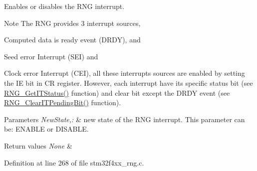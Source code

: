 Enables or disables the R\-N\-G interrupt. 

\begin{DoxyNote}{Note}
The R\-N\-G provides 3 interrupt sources,
\begin{DoxyItemize}
\item Computed data is ready event (D\-R\-D\-Y), and
\item Seed error Interrupt (S\-E\-I) and
\item Clock error Interrupt (C\-E\-I), all these interrupts sources are enabled by setting the I\-E bit in C\-R register. However, each interrupt have its specific status bit (see \hyperlink{group___r_n_g_gab58eaab67698770d9ea9775fb280271f}{R\-N\-G\-\_\-\-Get\-I\-T\-Status()} function) and clear bit except the D\-R\-D\-Y event (see \hyperlink{group___r_n_g_ga2b1c78c003cd5c886e09fdbc2c89cacb}{R\-N\-G\-\_\-\-Clear\-I\-T\-Pending\-Bit()} function). 
\end{DoxyItemize}
\end{DoxyNote}

\begin{DoxyParams}{Parameters}
{\em New\-State,\-:} & new state of the R\-N\-G interrupt. This parameter can be\-: E\-N\-A\-B\-L\-E or D\-I\-S\-A\-B\-L\-E. \\
\hline
\end{DoxyParams}

\begin{DoxyRetVals}{Return values}
{\em None} & \\
\hline
\end{DoxyRetVals}


Definition at line 268 of file stm32f4xx\-\_\-rng.\-c.

